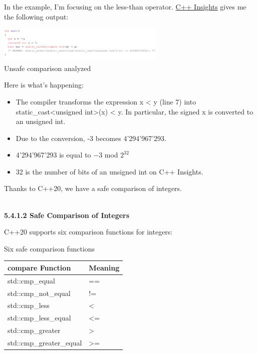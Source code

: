 In the example, I’m focusing on the less-than operator. \href{https://cppinsights.io/s/62732a01}{C++ Insights} gives me the following output:

\begin{center}
\includegraphics[width=0.6\textwidth]{content/3/chapter5/images/1-4.png}\\
Unsafe comparison analyzed
\end{center}

Here is what’s happening:

\begin{itemize}
\item 
The compiler transforms the expression x < y (line 7) into static\_cast<unsigned int>(x) < y. In particular, the signed x is converted to an unsigned int.

\item 
Due to the conversion, -3 becomes 4'294'967'293.

\item 
4'294'967'293 is equal to −3 mod $ 2^{32} $

\item 
32 is the number of bits of an unsigned int on C++ Insights.
\end{itemize}

Thanks to C++20, we have a safe comparison of integers.

\hspace*{\fill} \\ %
\noindent
\textbf{5.4.1.2\hspace{0.2cm} Safe Comparison of Integers}

C++20 supports six comparison functions for integers:

\begin{center}
Six safe comparison functions
\end{center}

\begin{table}[H]
\centering
\begin{tabular}{ll}
\textbf{compare Function} & \textbf{Meaning} \\ \hline
std::cmp\_equal           & ==               \\
std::cmp\_not\_equal      & !=               \\
std::cmp\_less            & \textless{}      \\
std::cmp\_less\_equal     & \textless{}=     \\
std::cmp\_greater         & \textgreater{}   \\
std::cmp\_greater\_equal  & \textgreater{}= 
\end{tabular}
\end{table}

